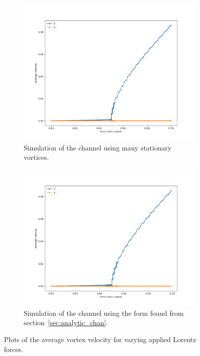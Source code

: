 \documentclass{article}
\numberwithin{equation}{section}
\begin{document}
\begin{figure}[htb]
\centering
\begin{subfigure}[t]{.49\textwidth}
    \centering
    \includegraphics[width=.9\linewidth]{results/Figures/Width1_velocities_cutoff=9.png}
    \caption{Simulation of the channel using many stationary vortices.}
    \label{fig:big_vels_channel}
\end{subfigure}
\hfill
\begin{subfigure}[t]{.49\textwidth}
    \centering
\includegraphics[width=.9\linewidth]{results/Figures/Width1_velocities_analytic_cutoff=9.png}
    \caption{Simulation of the channel using the form found from section~\ref{sec:analytic_chan}.}
    \label{fig:big_vels_analytic}
\end{subfigure}
\caption{Plots of the average vortex velocity for varying applied Lorentz forces.}
\label{fig:big_vels}
\end{figure}
\end{document}
